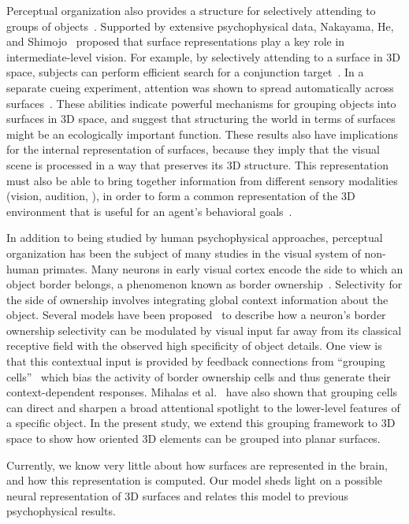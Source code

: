 Perceptual organization also provides a structure for selectively
attending to groups of objects~\cite{Treisman_Gelade80}. Supported by
extensive psychophysical data, Nakayama, He, and Shimojo~\cite{Nakayama_etal95} proposed that surface representations
play a key role in intermediate-level vision. For example, by selectively attending to a surface in 3D space, subjects can perform
efficient search for a conjunction target~\cite{Nakayama_Silverman86}. In a separate cueing experiment, attention was shown to spread automatically across surfaces~\cite{He_Nakayama95}. These abilities indicate powerful mechanisms for grouping objects into surfaces in 3D space, and suggest that structuring the world in terms of surfaces might be an ecologically important function. These results also have implications for the internal representation of surfaces, because they imply that the visual scene is processed in a way that preserves its 3D
structure. This representation must also be able to bring together
information from different sensory modalities (\eg vision, audition,
\etc), in order to form a common representation of the 3D environment
that is useful for an agent's behavioral goals~\cite{Lewicki_etal14}.

In addition to being studied by human psychophysical approaches, perceptual organization has been the subject of many studies in the
visual system of non-human primates. Many neurons in early visual cortex encode the side to which an object border belongs, a phenomenon known as border ownership~\cite{Zhou_etal00}. Selectivity for the side of ownership involves integrating global context information about the
object. Several models have been proposed~\cite{Zhaoping05, Craft_etal07} to describe how a neuron's border ownership selectivity can be modulated by visual input far away from its classical receptive field with the observed high specificity of object details. One view is that this contextual input is provided by feedback connections from ``grouping cells''~\cite{Craft_etal07} which bias the activity of border ownership cells and thus generate their context-dependent responses. Mihalas et al.~\cite{Mihalas_etal11b} have also shown that
grouping cells can direct and sharpen a broad attentional spotlight to
the lower-level features of a specific object. In the present study, we extend this grouping framework to 3D space to show how oriented 3D
elements can be grouped into planar surfaces.

Currently, we know very little about how surfaces are represented in
the brain, and how this representation is computed.  Our model sheds
light on a possible neural representation of 3D surfaces and relates
this model to previous psychophysical results.

